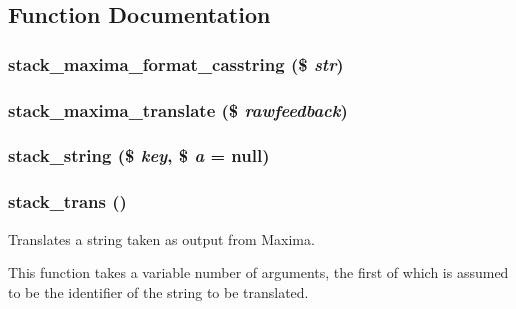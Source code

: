 \subsection{Function Documentation}
\hypertarget{locallib_8php_aefa2a15227e5139502714aaea0d7b559}{
\subsubsection[{stack\_\-maxima\_\-format\_\-casstring}]{\setlength{\rightskip}{0pt plus 5cm}stack\_\-maxima\_\-format\_\-casstring (\$ {\em str})}}
\label{locallib_8php_aefa2a15227e5139502714aaea0d7b559}
\hypertarget{locallib_8php_a3c8ef43c050b07992a9ae5fc13b43336}{
\subsubsection[{stack\_\-maxima\_\-translate}]{\setlength{\rightskip}{0pt plus 5cm}stack\_\-maxima\_\-translate (\$ {\em rawfeedback})}}
\label{locallib_8php_a3c8ef43c050b07992a9ae5fc13b43336}
\hypertarget{locallib_8php_a924130d2bdfcf1e962f0d7646582189d}{
\subsubsection[{stack\_\-string}]{\setlength{\rightskip}{0pt plus 5cm}stack\_\-string (\$ {\em key}, \/  \$ {\em a} = {\ttfamily null})}}
\label{locallib_8php_a924130d2bdfcf1e962f0d7646582189d}
\hypertarget{locallib_8php_a7a72dd09633d87d845f3c0be6b65fc8e}{
\subsubsection[{stack\_\-trans}]{\setlength{\rightskip}{0pt plus 5cm}stack\_\-trans ()}}
\label{locallib_8php_a7a72dd09633d87d845f3c0be6b65fc8e}
Translates a string taken as output from Maxima.

This function takes a variable number of arguments, the first of which is assumed to be the identifier of the string to be translated. 